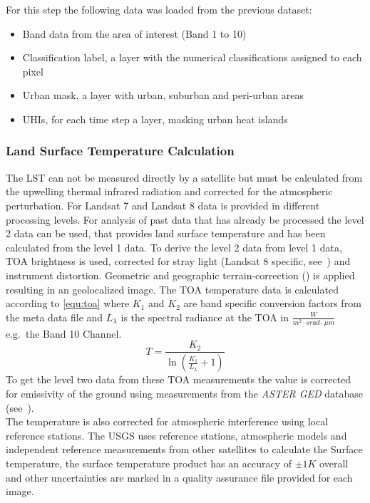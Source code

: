 \documentclass[12pt,a4paper, english,twoside]{scrartcl}
\begin{document}
      For this step the following data was loaded from the previous dataset: 
      \begin{itemize}
        \item Band data from the area of interest (Band 1 to 10)
        \item Classification label, a layer with the numerical classifications assigned to each pixel 
        \item Urban mask, a layer with urban, suburban and peri-urban areas
        \item \glspl{UHI}, for each time step a layer, masking urban heat islands
      \end{itemize}
    \subsubsection{Land Surface Temperature Calculation}\label{sec:lstcalc}
      The \gls{LST} can not be measured directly by a satellite but must be calculated from the upwelling thermal infrared radiation and corrected for the atmospheric perturbation. 
      For Landsat 7 and Landsat 8 data is provided in different processing levels.
      For analysis of past data that has already be processed the level 2 data can be used, that provides land surface temperature and has been calculated from the level 1 data. 
      To derive the level 2 data from level 1 data, \gls{TOA} brightness is used, corrected for stray light (Landsat 8 specific, see~\autocite[p.~67]{Zanter2019}) and instrument distortion. 
      Geometric and geographic terrain-correction (\cite[p.~44]{Zanter2019}) is applied resulting in an geolocalized image.
      The \gls{TOA} temperature data is calculated according to \cref{equ:toa} where $K_1$ and $K_2$ are band specific conversion factors from the meta data file and $L_\lambda$ is the spectral radiance at the \gls{TOA} in $\frac{W}{m^2\cdot srad \cdot \mu m}$ e.g.\ the Band 10 Channel. 
      \begin{equation}\label{equ:toa}
  	    T = \frac{K_2}{\ln\left(\frac{K_1}{L_{\lambda}}+1\right)}
      \end{equation}
      To get the level two data from these \gls{TOA} measurements the value is corrected for emissivity of the ground using measurements from the \textit{ASTER GED} database (see~\cite{USGSWebsite}).\\
      The temperature is also corrected for atmospheric interference using local reference stations. 
      The \gls{USGS} uses reference stations, atmospheric models and independent reference measurements from other satellites to calculate the Surface temperature, the surface temperature product has an accuracy of $\pm 1 K$ overall and other uncertainties are marked in a quality assurance file provided for each image.\\
\end{document}
